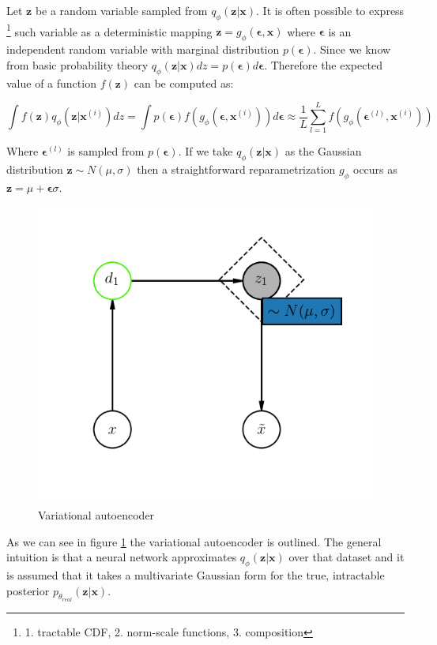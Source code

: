 \documentclass[12pt, english]{article}
\begin{document}
\par Let $\bm{z}$ be a random variable sampled from $   q_{\phi}(\bm{z} | \bm{x})$. It is often possible to express \footnote{1. tractable CDF, 2. norm-scale functions, 3. composition} such variable as a deterministic mapping $\bm{z} = g_{\phi}(\bm{\epsilon}, \bm{x})$ where $\bm{\epsilon}$ is an independent random variable with marginal distribution $p(\bm{\epsilon})$. Since we know from basic probability theory $q_{\phi}(\bm{z} | \bm{x})dz = p(\bm{\epsilon})d\bm{\epsilon}$. Therefore the expected value of a function $f(\bm{z})$ can be computed as:

\vspace{4mm}

\begin{equation}
    \int f(\bm{z})q_{\phi}(\bm{z} | \bm{x}^{(i)})dz = \int p(\bm{\epsilon})f(g_{\phi}(\bm{\epsilon}, \bm{x}^{(i)})) d\bm{\epsilon} \approx \frac{1}{L}\sum_{l=1}^{L}f(g_{\phi}(\bm{\epsilon}^{(l)}, \bm{x}^{(i)}))
\end{equation}

\vspace{4mm}

\par Where $\bm{\epsilon}^{(l)}$ is sampled from $p(\bm{\epsilon})$. If we take $q_{\phi}(\bm{z} | \bm{x})$ as the Gaussian distribution $\bm{z} \sim N(\mu, \sigma)$ then a straightforward reparametrization $g_{\phi}$ occurs as $\bm{z} = \mu + \bm{\epsilon} \sigma$.

\vspace{4mm}

\begin{figure}[H]
    \centering
    \includegraphics[width=0.33\linewidth]{vae.png}
    \caption{Variational autoencoder}
    \label{fig:vae}
\end{figure}

\vspace{4mm}

\par As we can see in figure \ref{fig:vae} the variational autoencoder is outlined. The general intuition is that a neural network approximates $q_{\phi}(\bm{z} | \bm{x})$ over that dataset and it is assumed that it takes a multivariate Gaussian form for the true, intractable posterior $p_{\theta_{real}}(\bm{z} | \bm{x})$.
\end{document}
